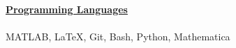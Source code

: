 \documentclass[letterpaper,11pt,oneside]{article}
\newcommand{\headr}[1]{\vspace{10pt}\uline{\Large{\textbf{#1}} \hfill } \\ \vspace{-10pt}\\}
\begin{document}
\headr{Programming Languages}

MATLAB, \LaTeX, Git, Bash, Python, Mathematica\\



\end{document}
